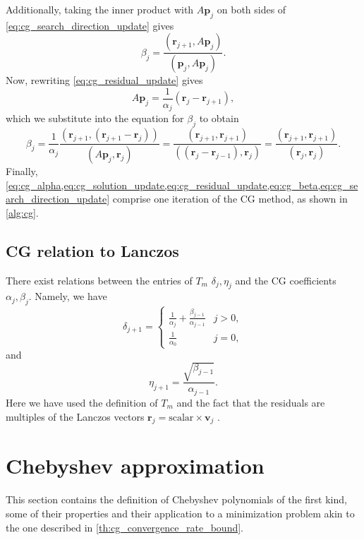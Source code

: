Additionally, taking the inner product with $A \mathbf{p}_j$ on both sides of \cref{eq:cg_search_direction_update} gives
\[
  \beta_j = \frac{(\mathbf{r}_{j+1}, A \mathbf{p}_j)}{(\mathbf{p}_j, A \mathbf{p}_j)}.
\]
Now, rewriting \cref{eq:cg_residual_update} gives
\[
  A \mathbf{p}_j = \frac{1}{\alpha_j} (\mathbf{r}_j - \mathbf{r}_{j+1}),
\]
which we substitute into the equation for $\beta_j$ to obtain
\begin{equation}
  \beta_j = \frac{1}{\alpha_j}\frac{(\mathbf{r}_{j+1}, (\mathbf{r}_{j+1}-\mathbf{r}_j))}{(A \mathbf{p}_j, \mathbf{r}_j)} = \frac{(\mathbf{r}_{j+1},\mathbf{r}_{j+1})}{((\mathbf{r}_j - \mathbf{r}_{j-1}), \mathbf{r}_j)} = \frac{(\mathbf{r}_{j+1},\mathbf{r}_{j+1})}{(\mathbf{r}_j, \mathbf{r}_j)}.
  \label{eq:cg_beta}
\end{equation}
Finally, \cref{eq:cg_alpha,eq:cg_solution_update,eq:cg_residual_update,eq:cg_beta,eq:cg_search_direction_update} comprise one iteration of the CG method, as shown in \cref{alg:cg}.

\subsection{CG relation to Lanczos}
There exist relations between the entries of $T_m$ $\delta_j, \eta_j$ and the CG coefficients $\alpha_j, \beta_j$. Namely, we have
\begin{equation}
  \delta_{j+1} =
  \begin{cases}
    \frac{1}{\alpha_j} + \frac{\beta_{j-1}}{\alpha_{j-1}} & j > 0, \\
    \frac{1}{\alpha_0}                                    & j = 0,
  \end{cases}
  \label{eq:cg_lanczos_delta}
\end{equation}
and
\begin{equation}
  \eta_{j+1} = \frac{\sqrt{\beta_{j-1}}}{\alpha_{j-1}}.
  \label{eq:cg_lanczos_eta}
\end{equation}
Here we have used the definition of $T_m$ and the fact that the residuals are multiples of the Lanczos vectors $\mathbf{r}_j = \text{scalar} \times \mathbf{v}_j$ \cite[Equation 6.103]{iter_method_saad}.

\section{Chebyshev approximation}\label{sec:chebyshev_approximation}
This section contains the definition of Chebyshev polynomials of the first kind, some of their properties and their application to a minimization problem akin to the one described in \cref{th:cg_convergence_rate_bound}.

